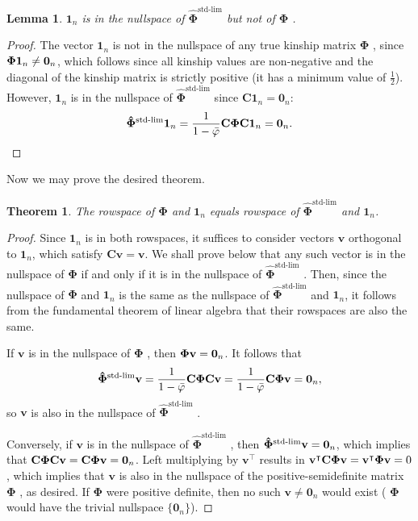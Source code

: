 \documentclass[11pt]{article}
\newcommand{\kinMat}{%
  \ensuremath{%
    \mathbf{\Phi}
  }%
  \xspace%
}%
\newcommand{\kinMatStdLim}{%
  \ensuremath{%
    \mathbf{\hat{\Phi}}^\text{std-lim}
  }%
  \xspace%
}%
\newtheorem*{thm}{Theorem}
\newtheorem*{lem}{Lemma}
\begin{document}
\begin{lem}
  $\mathbf{1}_n$ is in the nullspace of \kinMatStdLim but not of \kinMat.
\end{lem}

\begin{proof}
The vector $\mathbf{1}_n$ is not in the nullspace of any true kinship matrix \kinMat, since $\kinMat \mathbf{1}_n \neq \mathbf{0}_n$, which follows since all kinship values are non-negative and the diagonal of the kinship matrix is strictly positive (it has a minimum value of $\frac{1}{2}$).
However, $\mathbf{1}_n$ is in the nullspace of \kinMatStdLim since $\mathbf{C} \mathbf{1}_n = \mathbf{0}_n$:
$$
\kinMatStdLim \mathbf{1}_n
=
\frac{1}{1 - \bar{\varphi}}
\mathbf{C} \kinMat \mathbf{C} \mathbf{1}_n
=
\mathbf{0}_n
.
$$
\end{proof}

Now we may prove the desired theorem.

\begin{thm}
  The rowspace of \kinMat and $\mathbf{1}_n$ equals rowspace of \kinMatStdLim and $\mathbf{1}_n$.
\end{thm}

\begin{proof}
  Since $\mathbf{1}_n$ is in both rowspaces, it suffices to consider vectors $\mathbf{v}$ orthogonal to $\mathbf{1}_n$, which satisfy $\mathbf{C} \mathbf{v} = \mathbf{v}$.
  We shall prove below that any such vector is in the nullspace of \kinMat if and only if it is in the nullspace of \kinMatStdLim.
  Then, since the nullspace of \kinMat and $\mathbf{1}_n$ is the same as the nullspace of \kinMatStdLim and $\mathbf{1}_n$, it follows from the fundamental theorem of linear algebra that their rowspaces are also the same.
  
  If $\mathbf{v}$ is in the nullspace of \kinMat, then $\kinMat \mathbf{v} = \mathbf{0}_n$.
  It follows that
  $$
  \kinMatStdLim \mathbf{v}
  =
  \frac{1}{1 - \bar{\varphi}}
  \mathbf{C} \kinMat \mathbf{C} \mathbf{v}
  =
  \frac{1}{1 - \bar{\varphi}}
  \mathbf{C} \kinMat \mathbf{v}
  =
  \mathbf{0}_n
  ,
  $$
  so $\mathbf{v}$ is also in the nullspace of \kinMatStdLim.
  
  Conversely, if $\mathbf{v}$ is in the nullspace of \kinMatStdLim, then $\kinMatStdLim \mathbf{v} = \mathbf{0}_n$, which implies that
  $
  \mathbf{C} \kinMat \mathbf{C} \mathbf{v}
  =
  \mathbf{C} \kinMat \mathbf{v}
  =
  \mathbf{0}_n
  $.
  Left multiplying by $\mathbf{v}^\intercal$ results in
  $
  \mathbf{v}^\intercal \mathbf{C} \kinMat \mathbf{v}
  =
  \mathbf{v}^\intercal \kinMat \mathbf{v}
  =
  0
  $, which implies that $\mathbf{v}$ is also in the nullspace of the positive-semidefinite matrix \kinMat, as desired.
  If \kinMat were positive definite, then no such $\mathbf{v} \ne \mathbf{0}_n$ would exist (\kinMat would have the trivial nullspace $\{ \mathbf{0}_n \}$).
\end{proof}
\end{document}
